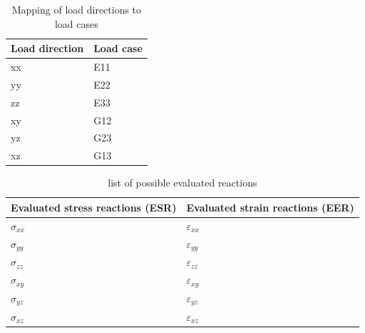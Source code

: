     \begin{table}[h!] 
    \centering
    \caption{Mapping of load directions to load cases}
    \label{tab:LoadCaseMapping}
    \renewcommand{\arraystretch}{1.1}
    \begin{tabular}{C{0.2\textwidth}C{0.15\textwidth}}
    \toprule
    \textbf{Load direction} & \textbf{Load case} \\ \midrule
    xx & E11 \\ \hline
    yy & E22 \\ \hline
    zz & E33  \\ \hline
    xy & G12 \\ \hline
    yz & G23 \\ \hline
    xz & G13 \\ \bottomrule
    \end{tabular}
    \end{table}

    \begin{table}[H]
    \centering
    \caption{list of possible evaluated reactions}
    \label{tab:evaluatedReactions}
    \renewcommand{\arraystretch}{1.1}
    \begin{tabular}{C{0.25\textwidth}C{0.25\textwidth}}
    \toprule
    \textbf{Evaluated stress reactions (ESR)} & \textbf{Evaluated strain reactions (EER)} \\ \midrule
    $\sigma_{xx}$ & $\varepsilon_{xx}$ \\ \hline
    $\sigma_{yy}$ & $\varepsilon_{yy}$  \\ \hline
    $\sigma_{zz}$ & $\varepsilon_{zz}$ \\ \hline
    $\sigma_{xy}$ & $\varepsilon_{xy}$ \\ \hline
    $\sigma_{yz}$ & $\varepsilon_{yz}$ \\ \hline
    $\sigma_{xz}$ & $\varepsilon_{xz}$ \\ \bottomrule
    \end{tabular}
    
    \end{table}

